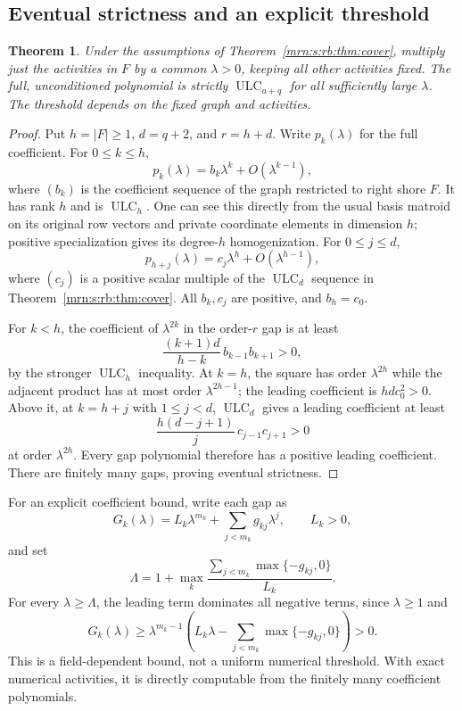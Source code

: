 \documentclass[11pt,a4paper]{article}
\newtheorem{theorem}{Theorem}[section]
\theoremstyle{remark}\newtheorem{remark}[theorem]{Remark}
\newcommand{\ULC}{\operatorname{ULC}}      %
\begin{document}
\subsection{Eventual strictness and an explicit threshold}
\begin{theorem}\label{mrn:s:rb:thm:eventual}
Under the assumptions of Theorem~\ref{mrn:s:rb:thm:cover}, multiply just the activities in $F$ by a common $\lambda>0$, keeping all other activities fixed. The full, unconditioned polynomial is strictly $\ULC_{a+q}$ for all sufficiently large $\lambda$. The threshold depends on the fixed graph and activities.
\end{theorem}
\begin{proof}
Put $h=|F|\ge1$, $d=q+2$, and $r=h+d$. Write $p_k(\lambda)$ for the full coefficient. For $0\le k\le h$,
\[
 p_k(\lambda)=b_k\lambda^k+O(\lambda^{k-1}),
\]
where $(b_k)$ is the coefficient sequence of the graph restricted to right shore $F$. It has rank $h$ and is $\ULC_h$. One can see this directly from the usual basis matroid on its original row vectors and private coordinate elements in dimension $h$; positive specialization gives its degree-$h$ homogenization. For $0\le j\le d$,
\[
 p_{h+j}(\lambda)=c_j\lambda^h+O(\lambda^{h-1}),
\]
where $(c_j)$ is a positive scalar multiple of the $\ULC_d$ sequence in Theorem~\ref{mrn:s:rb:thm:cover}. All $b_k,c_j$ are positive, and $b_h=c_0$.

For $k<h$, the coefficient of $\lambda^{2k}$ in the order-$r$ gap is at least
\[
 \frac{(k+1)d}{h-k}\,b_{k-1}b_{k+1}>0,
\]
by the stronger $\ULC_h$ inequality. At $k=h$, the square has order $\lambda^{2h}$ while the adjacent product has at most order $\lambda^{2h-1}$; the leading coefficient is $hdc_0^2>0$. Above it, at $k=h+j$ with $1\le j<d$, $\ULC_d$ gives a leading coefficient at least
\[
 \frac{h(d-j+1)}{j}\,c_{j-1}c_{j+1}>0
\]
at order $\lambda^{2h}$. Every gap polynomial therefore has a positive leading coefficient. There are finitely many gaps, proving eventual strictness.
\end{proof}
For an explicit coefficient bound, write each gap as
\[
 G_k(\lambda)=L_k\lambda^{m_k}+\sum_{j<m_k}g_{kj}\lambda^j,
 \qquad L_k>0,
\]
and set
\begin{equation}\label{mrn:s:rb:eq:threshold}
 \Lambda=1+\max_k\frac{\sum_{j<m_k}\max\{-g_{kj},0\}}{L_k}.
\end{equation}
For every $\lambda\ge\Lambda$, the leading term dominates all negative terms, since $\lambda\ge1$ and
\[
 G_k(\lambda)\ge\lambda^{m_k-1}
 \left(L_k\lambda-\sum_{j<m_k}\max\{-g_{kj},0\}\right)>0.
\]
This is a field-dependent bound, not a uniform numerical threshold. With exact numerical activities, it is directly computable from the finitely many coefficient polynomials.
\end{document}
